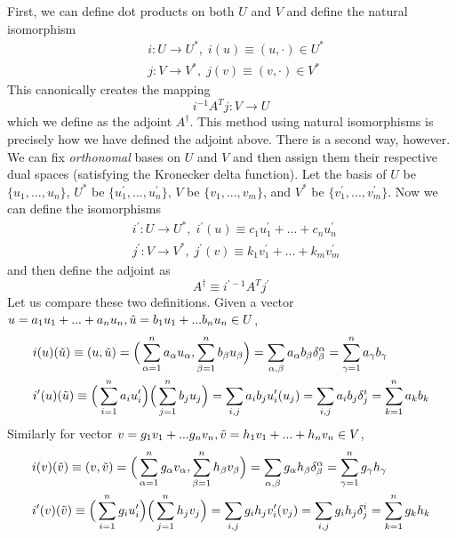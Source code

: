 \documentclass{article}
\theoremstyle{remark}
\theoremstyle{definition}
\begin{document}
First, we can define dot products on both $U$ and $V$ and define the natural isomorphism 
\begin{align*}
    &i: U \longrightarrow U^*, \; i(u) \equiv (u, \cdot) \in U^*\\
    &j: V \longrightarrow V^*, \; j(v) \equiv (v, \cdot) \in V^*
\end{align*}
This canonically creates the mapping 
\[i^{-1} A^T j: V \longrightarrow U\]
which we define as the adjoint $A^\dagger$. This method using natural isomorphisms is precisely how we have defined the adjoint above. There is a second way, however. We can fix \textit{orthonomal} bases on $U$ and $V$ and then assign them their respective dual spaces (satisfying the Kronecker delta function). Let the basis of $U$ be $\{u_1, ..., u_n\}$, $U^*$ be $\{u_1^\prime, ..., u_n^\prime\}$, $V$ be $\{v_1, ..., v_m\}$, and $V^*$ be $\{v_1^\prime, ..., v_m^\prime\}$. Now we can define the isomorphisms 
\begin{align*}
    & i^\prime: U \longrightarrow U^*, \; i^\prime (u) \equiv c_1 u_1^\prime + ... + c_n u_n^\prime \\
    & j^\prime: V \longrightarrow V^*, \; j^\prime (v) \equiv k_1 v_1^\prime + ... + k_m v_m^\prime
\end{align*}
and then define the adjoint as 
\[A^\dagger \equiv i^{\prime -1} A^T j^\prime\]
Let us compare these two definitions. Given a vector $u = a_1 u_1 + ... + a_n u_n, \Tilde{u} = b_1 u_1 + ... b_n u_n \in U$, 
\begin{align*}
    &i(u)(\Tilde{u}) \equiv (u, \Tilde{u}) = \Big(\sum_{\alpha = 1}^n a_\alpha u_\alpha, \sum_{\beta = 1}^n b_\beta u_\beta \Big) = \sum_{\alpha, \beta} a_\alpha b_\beta \delta^\alpha_\beta = \sum_{\gamma=1}^n a_\gamma b_\gamma \\
    &i^\prime(u)(\Tilde{u}) \equiv \Big(\sum_{i=1}^n a_i u_i^\prime \Big) \Big( \sum_{j=1}^n b_j u_j \Big) = \sum_{i, j} a_i b_j u_i^\prime (u_j) = \sum_{i, j} a_i b_j \delta^i_j = \sum_{k=1}^n a_k b_k
\end{align*}
Similarly for vector $v = g_1 v_1 + ... g_n v_n, \Tilde{v} = h_1 v_1 + ... + h_n v_n \in V$, 
\begin{align*}
    &i(v)(\Tilde{v}) \equiv (v, \Tilde{v}) = \Big(\sum_{\alpha = 1}^n g_\alpha v_\alpha, \sum_{\beta = 1}^n h_\beta v_\beta \Big) = \sum_{\alpha, \beta} g_\alpha h_\beta \delta^\alpha_\beta = \sum_{\gamma=1}^n g_\gamma h_\gamma \\
    &i^\prime(v)(\Tilde{v}) \equiv \Big(\sum_{i=1}^n g_i u_i^\prime \Big) \Big( \sum_{j=1}^n h_j v_j \Big) = \sum_{i, j} g_i h_j v_i^\prime (v_j) = \sum_{i, j} g_i h_j \delta^i_j = \sum_{k=1}^n g_k h_k
\end{align*}
\end{document}
